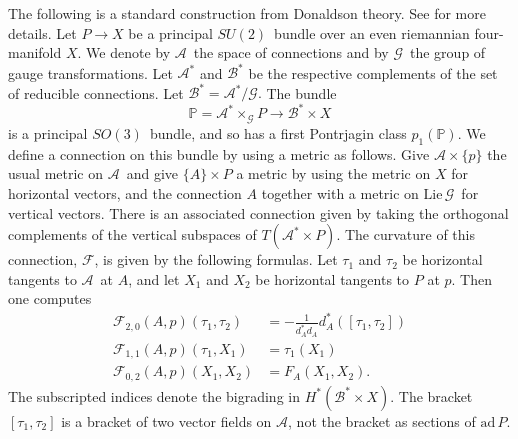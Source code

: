 \documentclass[twoside]{amsart}
\newcommand{\PP}{\ensuremath{\mathbb{P}}}
\newcommand{\enm}[1]{\ensuremath{#1}}
\renewcommand{\aa}{\enm{\mathcal{A}}}
\newcommand{\bb}{\enm{\mathcal{B}}}
\renewcommand{\gg}{\enm{\mathcal{G}}}
\newcommand{\sut}{\enm{SU(2)}}
\newcommand{\sot}{\enm{SO(3)}}
\newcommand{\ad}{\enm{\mathrm{ad}}}
\newcommand{\ff}{\enm{\mathcal{F}}}
\newcommand{\adp}{\enm{\ad\,P}}
\newcommand{\lieg}{\enm{\mathrm{Lie}\,\gg}}
\begin{document}
The following is a standard construction from Donaldson theory.  See
\cite{donaldsonkronheimer} for more details.  Let \( P\to X \) be a
principal \sut\ bundle over an even riemannian four-manifold \( X \).
We denote by \aa\ the space of connections and by \gg\ the group of
gauge transformations.  Let \( \aa^{*} \) and
\( \bb^{*} \) be the respective complements of the set of reducible
connections.  Let \( \bb^*=\aa^*/\gg.  \) The bundle
\[ \PP=\aa^{*}\times_{\gg}P\to \bb^{*}\times X \]
is a principal \sot\ bundle, and so has a first Pontrjagin class \(
p_{1}(\PP) \).  We define a connection on this bundle by using a
metric as follows.  Give \( \aa\times\{p\} \)
the usual metric on \aa\ and give \( \{A\}\times P \) a metric by
using the metric on \(
X \) for horizontal vectors, and the connection \( A \) together with
a metric on \lieg\ for vertical vectors.
There is an associated connection given by taking the orthogonal
complements of the vertical subspaces of \( T(\aa^{*}\times P).  \)
The curvature of this connection, \ff, is given by the following
formulas.  Let \( \tau_{1} \) and \( \tau_{2} \) be horizontal
tangents to \aa\ at \( A \), and let \( X_{1} \) and \( X_{2} \) be
horizontal tangents to \( P \) at \( p \).  Then one computes
\begin{align}
    \ff_{2,0}(A, p)(\tau_{1}, \tau_{2}) &=
    -\frac{1}{d_{A}^{*}d_{A}}d_{A}^{*}([\tau_{1}, \tau_{2}]) \\
    \ff_{1,1}(A, p)(\tau_{1}, X_{1}) &= \tau_{1}(X_{1}) \\
    \ff_{0,2}(A, p)(X_{1}, X_{2}) &= F_{A}(X_{1}, X_{2}).
\end{align}
The subscripted indices denote the bigrading in \(
H^{*}(\bb^{*}\times X). \)  The bracket \([\tau_1,\tau_2]\) is a
bracket of two vector fields on \aa, not the bracket as sections of
\adp.
\end{document}
